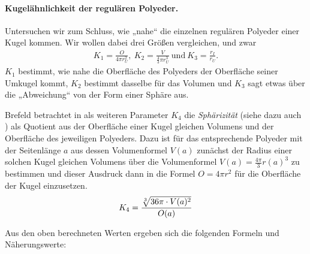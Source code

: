 \documentclass[11pt]{article}
\begin{document}
\paragraph{Kugelähnlichkeit der regulären Polyeder.}
Untersuchen wir zum Schluss, wie „nahe“ die einzelnen regulären Polyeder einer
Kugel kommen.  Wir wollen dabei drei Größen vergleichen, und zwar
\begin{gather*}
  K_1=\frac{O}{4\pi r_U^2},\ K_2=\frac{V}{\frac43\pi
    r_U^3}\ \text{und}\ K_3=\frac{r_I}{r_U}.
\end{gather*}
$K_1$ bestimmt, wie nahe die Oberfläche des Polyeders der Oberfläche seiner
Umkugel kommt, $K_2$ bestimmt dasselbe für das Volumen und $K_3$ sagt etwas
über die „Abweichung“ von der Form einer Sphäre aus.

Brefeld betrachtet in \cite{Brefeld} als weiteren Parameter $K_4$ die
\emph{Sphärizität} (siehe dazu auch \cite{Sphaer}) als Quotient aus der
Oberfläche einer Kugel gleichen Volumens und der Oberfläche des jeweiligen
Polyeders.  Dazu ist für das entsprechende Polyeder mit der Seitenlänge $a$
aus dessen Volumenformel $V(a)$ zunächst der Radius einer solchen Kugel
gleichen Volumens über die Volumenformel $V(a)=\frac{4\pi}{3}r(a)^3$ zu
bestimmen und dieser Ausdruck dann in die Formel $O=4\pi r^2$ für die
Oberfläche der Kugel einzusetzen.
\begin{gather*}
  K_4=\frac{\sqrt[3]{36\pi\cdot V(a)^2}}{O(a)}
\end{gather*}
\newpage

Aus den oben berechneten Werten ergeben sich die folgenden Formeln und
Näherungswerte:
\end{document}
